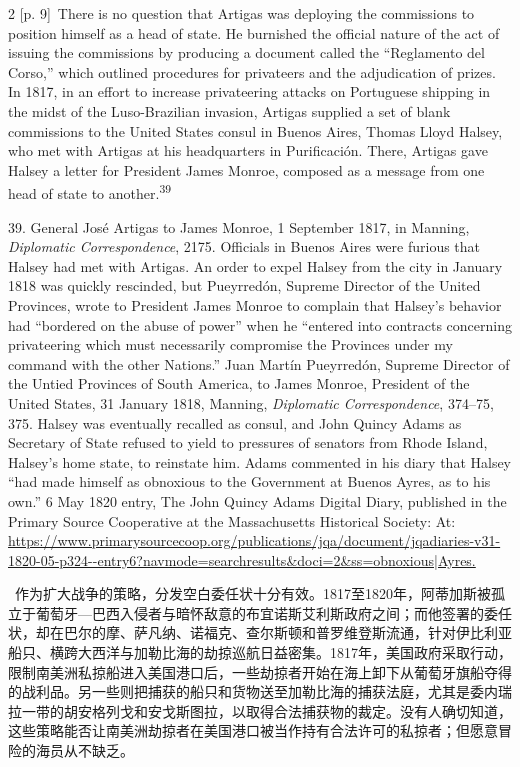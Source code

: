 \documentclass[10pt,a4paper]{article}
\begin{document}
\begin{paracol}{2}
{\scriptsize\color{gray} [p. 9]}\ There is no question that Artigas was deploying the commissions to position himself as a head of state. He burnished the official nature of the act of issuing the commissions by producing a document called the “Reglamento del Corso,” which outlined procedures for privateers and the adjudication of prizes. In 1817, in an effort to increase privateering attacks on Portuguese shipping in the midst of the Luso-Brazilian invasion, Artigas supplied a set of blank commissions to the United States consul in Buenos Aires, Thomas Lloyd Halsey, who met with Artigas at his headquarters in Purificación. There, Artigas gave Halsey a letter for President James Monroe, composed as a message from one head of state to another.\nobreak\textsuperscript{39}\par{\small 39. General José Artigas to James Monroe, 1 September 1817, in Manning, \textit{Diplomatic Correspondence}, 2175. Officials in Buenos Aires were furious that Halsey had met with Artigas. An order to expel Halsey from the city in January 1818 was quickly rescinded, but Pueyrredón, Supreme Director of the United Provinces, wrote to President James Monroe to complain that Halsey’s behavior had “bordered on the abuse of power” when he “entered into contracts concerning privateering which must necessarily compromise the Provinces under my command with the other Nations.” Juan Martín Pueyrredón, Supreme Director of the Untied Provinces of South America, to James Monroe, President of the United States, 31 January 1818, Manning, \textit{Diplomatic Correspondence}, 374–75, 375. Halsey was eventually recalled as consul, and John Quincy Adams as Secretary of State refused to yield to pressures of senators from Rhode Island, Halsey’s home state, to reinstate him. Adams commented in his diary that Halsey “had made himself as obnoxious to the Government at Buenos Ayres, as to his own.” 6 May 1820 entry, The John Quincy Adams Digital Diary, published in the Primary Source Cooperative at the Massachusetts Historical Society: At: \url{https://www.primarysourcecoop.org/publications/jqa/document/jqadiaries-v31-1820-05-p324--entry6?navmode=searchresults&doci=2&ss=obnoxious|Ayres.}\par}
\switchcolumn*
{\scriptsize\color{gray} [p. 10]}\ 作为扩大战争的策略，分发空白委任状十分有效。1817至1820年，阿蒂加斯被孤立于葡萄牙—巴西入侵者与暗怀敌意的布宜诺斯艾利斯政府之间；而他签署的委任状，却在巴尔的摩、萨凡纳、诺福克、查尔斯顿和普罗维登斯流通，针对伊比利亚船只、横跨大西洋与加勒比海的劫掠巡航日益密集。1817年，美国政府采取行动，限制南美洲私掠船进入美国港口后，一些劫掠者开始在海上卸下从葡萄牙旗船夺得的战利品。另一些则把捕获的船只和货物送至加勒比海的捕获法庭，尤其是委内瑞拉一带的胡安格列戈和安戈斯图拉，以取得合法捕获物的裁定。没有人确切知道，这些策略能否让南美洲劫掠者在美国港口被当作持有合法许可的私掠者；但愿意冒险的海员从不缺乏。\par

\end{paracol}
\end{document}
